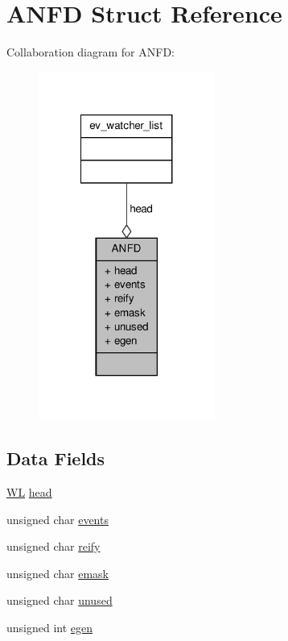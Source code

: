 \hypertarget{struct_a_n_f_d}{\section{\-A\-N\-F\-D \-Struct \-Reference}
\label{struct_a_n_f_d}
}


\-Collaboration diagram for \-A\-N\-F\-D\-:
\nopagebreak
\begin{figure}[H]
\begin{center}
\leavevmode
\includegraphics[width=164pt]{struct_a_n_f_d__coll__graph}
\end{center}
\end{figure}
\subsection*{\-Data \-Fields}
\begin{DoxyCompactItemize}
\item 
\hyperlink{ev_8c_a0828ab15b964af31c49b160d210ca60b}{\-W\-L} \hyperlink{struct_a_n_f_d_adfe98a723723ae76746a9a793f2bd862}{head}
\item 
unsigned char \hyperlink{struct_a_n_f_d_a6afb9ac2ccc07c1c5c4adb0ba40fe303}{events}
\item 
unsigned char \hyperlink{struct_a_n_f_d_a9f83e28e70418fa3d19299c0a6562dc9}{reify}
\item 
unsigned char \hyperlink{struct_a_n_f_d_acfe97a2a9e6eb619c00317e774f11b76}{emask}
\item 
unsigned char \hyperlink{struct_a_n_f_d_ad10d012877d07ca3b2e818f11bf97a0f}{unused}
\item 
unsigned int \hyperlink{struct_a_n_f_d_ae3d672a0de46c808d2bae5a187b54478}{egen}
\end{DoxyCompactItemize}


